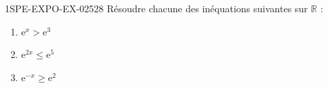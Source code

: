 \begin{exercice}{1SPE-EXPO-EX-025}{2}{8}
Résoudre chacune des inéquations suivantes sur $\mathbb{R}$ :
\begin{enumerate}
  \item $\mathrm{e}^x > \mathrm{e}^3$
  \item $\mathrm{e}^{2x} \leqslant \mathrm{e}^5$
  \item $\mathrm{e}^{-x} \geqslant \mathrm{e}^2$
\end{enumerate}
\end{exercice}
